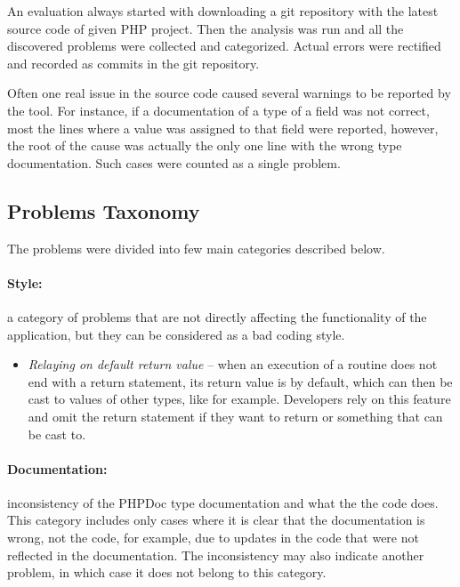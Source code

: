 An evaluation always started with downloading a git repository with the 
latest source code of given PHP project. Then the analysis was run and 
all the discovered problems were collected and categorized.
Actual errors were rectified and recorded as commits in the 
git repository. 

Often one real issue in the source code caused several 
warnings to be reported by the tool. For instance, if a documentation 
of a type of a field was not correct, most the lines where 
a value was assigned to that field were reported, however, the 
root of the cause was actually the only one line with the 
wrong type documentation. Such cases were counted as a 
single problem.

\subsection{Problems Taxonomy}

The problems were divided into few main categories 
described below.

\paragraph*{Style:} a category of problems that 
are not directly affecting the functionality of the 
application, but they can be considered as a bad 
coding style. 

\begin{itemize}
    \item[] \textit{Relaying on default return value} -- when an execution of a 
        routine does not end with a return statement, its 
        return value is  by default, which can then 
        be cast to values of other types, like  
        for example. Developers rely on this feature and omit 
        the return statement if they want to return  or 
        something that  can be cast to.
\end{itemize}

\paragraph*{Documentation:} inconsistency of the PHPDoc type 
documentation and what the the code does. This category includes 
only cases where it is clear that the documentation is wrong, not the code, 
for example, due to updates in the code that were not reflected 
in the documentation. The inconsistency may also indicate 
another problem, in which case it does not belong to this category. 


